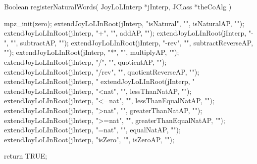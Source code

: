 \startCCode
Boolean registerNaturalWords(
  JoyLoLInterp *jInterp,
  JClass       *theCoAlg
) {
  mpz_init(zero);
  extendJoyLoLInRoot(jInterp, "isNatural", "", isNaturalAP,           "");
  extendJoyLoLInRoot(jInterp, "+",         "", addAP,                 "");
  extendJoyLoLInRoot(jInterp, "-",         "", subtractAP,            "");
  extendJoyLoLInRoot(jInterp, "-rev",      "", subtractReverseAP,     "");
  extendJoyLoLInRoot(jInterp, "*",         "", multiplyAP,            "");
  extendJoyLoLInRoot(jInterp, "/",         "", quotientAP,            "");
  extendJoyLoLInRoot(jInterp, "/rev",      "", quotientReverseAP,     "");
  extendJoyLoLInRoot(jInterp, "%
  extendJoyLoLInRoot(jInterp, "%
  extendJoyLoLInRoot(jInterp, "<nat",      "", lessThanNatAP,         "");
  extendJoyLoLInRoot(jInterp, "<=nat",     "", lessThanEqualNatAP,    "");
  extendJoyLoLInRoot(jInterp, ">nat",      "", greaterThanNatAP,      "");
  extendJoyLoLInRoot(jInterp, ">=nat",     "", greaterThanEqualNatAP, "");
  extendJoyLoLInRoot(jInterp, "=nat",      "", equalNatAP,            "");
  extendJoyLoLInRoot(jInterp, "isZero",    "", isZeroAP,              "");
  
  return TRUE;
}
\stopCCode
